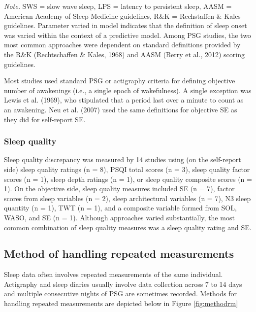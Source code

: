 \documentclass[
]{article}
\begin{document}
\emph{Note.} SWS = slow wave sleep, LPS = latency to persistent sleep, AASM = American Academy of Sleep Medicine guidelines, R\&K = Rechstaffen \& Kales guidelines. Parameter varied in model indicates that the definition of sleep onset was varied within the context of a predictive model. Among PSG studies, the two most common approaches were dependent on standard definitions provided by the R\&K (Rechtschaffen \& Kales, 1968) and AASM (Berry et al., 2012) scoring guidelines.

Most studies used standard PSG or actigraphy criteria for defining objective number of awakenings (i.e., a single epoch of wakefulness). A single exception was Lewis et al. (1969), who stipulated that a period last over a minute to count as an awakening. Neu et al. (2007) used the same definitions for objective SE as they did for self-report SE.

\subsubsection{Sleep quality}\label{sleep-quality}

Sleep quality discrepancy was measured by 14 studies using (on the self-report side) sleep quality ratings (n = 8), PSQI total scores (n = 3), sleep quality factor scores (n = 1), sleep depth ratings (n = 1), or sleep quality composite scores (n = 1). On the objective side, sleep quality measures included SE (n = 7), factor scores from sleep variables (n = 2), sleep architectural variables (n = 7), N3 sleep quantity (n = 1), TWT (n = 1), and a composite variable formed from SOL, WASO, and SE (n = 1). Although approaches varied substantially, the most common combination of sleep quality measures was a sleep quality rating and SE.

\subsection{Method of handling repeated measurements}\label{method-of-handling-repeated-measurements}

Sleep data often involves repeated measurements of the same individual. Actigraphy and sleep diaries usually involve data collection across 7 to 14 days and multiple consecutive nights of PSG are sometimes recorded. Methods for handling repeated measurements are depicted below in Figure \ref{fig:methodrm}
\end{document}
